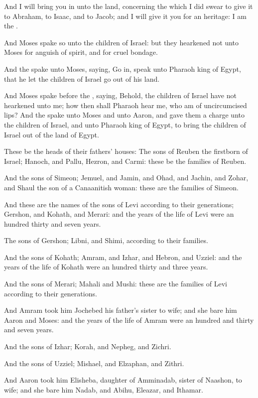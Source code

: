 \verse And I will bring you in unto the land, concerning the which I did swear to give it to Abraham, to Isaac, and to Jacob; and I will give it you for an heritage: I am the \LORD.

\verse And Moses spake so unto the children of Israel: but they hearkened not unto Moses for anguish of spirit, and for cruel bondage.

\verse And the \LORD spake unto Moses, saying, \verse Go in, speak unto Pharaoh king of Egypt, that he let the children of Israel go out of his land.

\verse And Moses spake before the \LORD, saying, Behold, the children of Israel have not hearkened unto me; how then shall Pharaoh hear me, who am of uncircumcised lips?  \verse And the \LORD spake unto Moses and unto Aaron, and gave them a charge unto the children of Israel, and unto Pharaoh king of Egypt, to bring the children of Israel out of the land of Egypt.

\verse These be the heads of their fathers' houses: The sons of Reuben the firstborn of Israel; Hanoch, and Pallu, Hezron, and Carmi: these be the families of Reuben.

\verse And the sons of Simeon; Jemuel, and Jamin, and Ohad, and Jachin, and Zohar, and Shaul the son of a Canaanitish woman: these are the families of Simeon.

\verse And these are the names of the sons of Levi according to their generations; Gershon, and Kohath, and Merari: and the years of the life of Levi were an hundred thirty and seven years.

\verse The sons of Gershon; Libni, and Shimi, according to their families.

\verse And the sons of Kohath; Amram, and Izhar, and Hebron, and Uzziel: and the years of the life of Kohath were an hundred thirty and three years.

\verse And the sons of Merari; Mahali and Mushi: these are the families of Levi according to their generations.

\verse And Amram took him Jochebed his father's sister to wife; and she bare him Aaron and Moses: and the years of the life of Amram were an hundred and thirty and seven years.

\verse And the sons of Izhar; Korah, and Nepheg, and Zichri.

\verse And the sons of Uzziel; Mishael, and Elzaphan, and Zithri.

\verse And Aaron took him Elisheba, daughter of Amminadab, sister of Naashon, to wife; and she bare him Nadab, and Abihu, Eleazar, and Ithamar.

